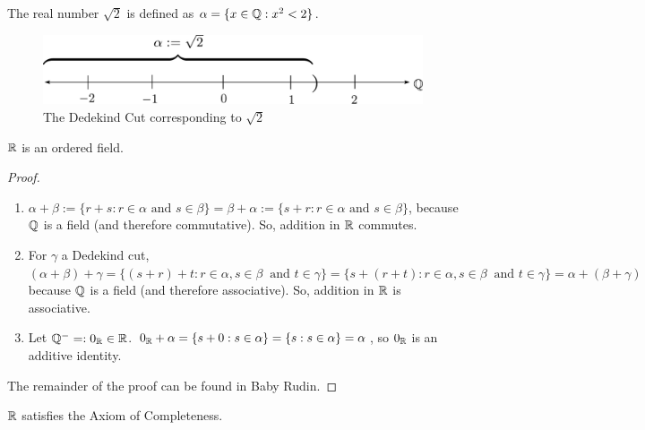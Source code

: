 \begin{eg}
		The real number $\sqrt{2}$ is defined as $\alpha = \{x\in \mathbb{Q} : x^2 < 2\}$.
        \begin{figure}[H]
    \centering
    \includegraphics[width=1\linewidth]{figures/sqrt2cut.pdf}
    \caption{The Dedekind Cut corresponding to $\sqrt{2}$}
    \label{fig:enter-label}
\end{figure}
\end{eg}

\begin{theorem}
	$\mathbb{R}$ is an ordered field.
\end{theorem}
\begin{proof}
	 \begin{enumerate}
	     \item $\alpha + \beta := \{r+s: r\in\alpha \text{ and } s\in\beta\}=\beta + \alpha := \{s+r: r\in\alpha \text{ and } s\in\beta\}$, because $\mathbb{Q}$ is a field (and therefore commutative). So, addition in $\mathbb{R}$ commutes.
        \item For $\gamma$ a Dedekind cut, $(\alpha + \beta)+\gamma = \{(s+r)+t: r\in\alpha, s\in\beta\ \text{ and } t\in\gamma\}=\{s+(r+t): r\in\alpha, s\in\beta\ \text{ and } t\in\gamma\} = \alpha + (\beta + 
    \gamma)$ because $\mathbb{Q}$ is a field (and therefore associative). So, addition in $\mathbb{R}$ is associative.
    \item Let $\mathbb{Q}^- =: 0_{\mathbb{R}} \in\mathbb{R}$. $0_{\mathbb{R}} + \alpha = \{s+0: s\in\alpha\}= \{s: s\in\alpha\} = \alpha$, so $0_{\mathbb{R}}$ is an additive identity.
	 \end{enumerate}  \hfill\break
   The remainder of the proof can be found in Baby Rudin.
\end{proof}
\begin{theorem}
	$\mathbb{R}$ satisfies the Axiom of Completeness.
\end{theorem}